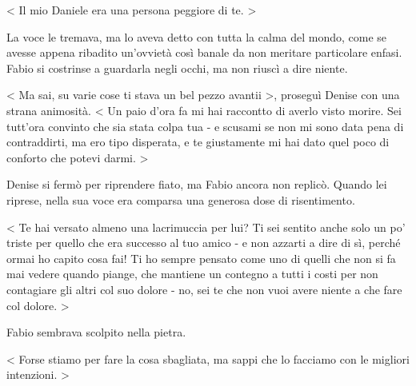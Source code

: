 < Il mio Daniele era una persona peggiore di te. >

La voce le tremava, ma lo aveva detto con tutta la calma del mondo, come se avesse appena ribadito un'ovvietà così banale da non meritare particolare enfasi. Fabio si costrinse a guardarla negli occhi, ma non riuscì a dire niente.

< Ma sai, su varie cose ti stava un bel pezzo avantii >, proseguì Denise con una strana animosità. < Un paio d'ora fa mi hai raccontto di averlo visto morire. Sei tutt'ora convinto che sia stata colpa tua - e scusami se non mi sono data pena di contraddirti, ma ero tipo disperata, e te giustamente mi hai dato quel poco di conforto che potevi darmi. >

Denise si fermò per riprendere fiato, ma Fabio ancora non replicò. Quando lei riprese, nella sua voce era comparsa una generosa dose di risentimento.

< Te hai versato almeno una lacrimuccia per lui? Ti sei sentito anche solo un po' triste per quello che era successo al tuo amico - e non azzarti a dire di sì, perché ormai ho capito cosa fai! Ti ho sempre pensato come uno di quelli che non si fa mai vedere quando piange, che mantiene un contegno a tutti i costi per non contagiare gli altri col suo dolore - no, sei te che non vuoi avere niente a che fare col dolore. >

Fabio sembrava scolpito nella pietra.

< Forse stiamo per fare la cosa sbagliata, ma sappi che lo facciamo con le migliori intenzioni. >
